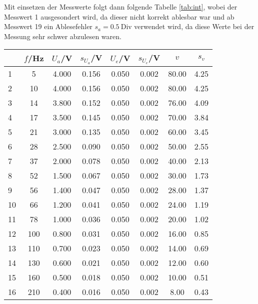 Mit einsetzen der Messwerte folgt dann folgende Tabelle \ref{tab:int}, wobei der Messwert 1 ausgesondert wird, da dieser nicht korrekt ablesbar war und ab Messwert 19 ein Ablesefehler $s_a = 0.5~\text{Div}$ verwendet wird, da diese Werte bei der Messung sehr schwer abzulesen waren.
\newpage
\begin{center}
    \begin{tabular}{l c c c c c | c c}
        {} &   $f$/Hz &  $U_a$/V &  $s_{U_a}$/V &  $U_e$/V &  $s_{U_e}$/V 
        &      $v$ &   $s_v$ \\
        \hline
        1  &      5 &  4.000 &      0.156 &   0.050 &      0.002 &  80.00 &  4.25 \\
        2  &     10 &  4.000 &      0.156 &   0.050 &      0.002 &  80.00 &  4.25 \\
        3  &     14 &  3.800 &      0.152 &   0.050 &      0.002 &  76.00 &  4.09 \\
        4  &     17 &  3.500 &      0.145 &   0.050 &      0.002 &  70.00 &  3.84 \\
        5  &     21 &  3.000 &      0.135 &   0.050 &      0.002 &  60.00 &  3.45 \\
        6  &     28 &  2.500 &      0.090 &   0.050 &      0.002 &  50.00 &  2.55 \\
        7  &     37 &  2.000 &      0.078 &   0.050 &      0.002 &  40.00 &  2.13 \\
        8  &     52 &  1.500 &      0.067 &   0.050 &      0.002 &  30.00 &  1.73 \\
        9  &     56 &  1.400 &      0.047 &   0.050 &      0.002 &  28.00 &  1.37 \\
        10 &     66 &  1.200 &      0.041 &   0.050 &      0.002 &  24.00 &  1.19 \\
        11 &     78 &  1.000 &      0.036 &   0.050 &      0.002 &  20.00 &  1.02 \\
        12 &    100 &  0.800 &      0.031 &   0.050 &      0.002 &  16.00 &  0.85 \\
        13 &    110 &  0.700 &      0.023 &   0.050 &      0.002 &  14.00 &  0.69 \\
        14 &    130 &  0.600 &      0.021 &   0.050 &      0.002 &  12.00 &  0.60 \\
        15 &    160 &  0.500 &      0.018 &   0.050 &      0.002 &  10.00 &  0.51 \\
        16 &    210 &  0.400 &      0.016 &   0.050 &      0.002 &   8.00 &  0.43 \\

\end{tabular}
\end{center}
